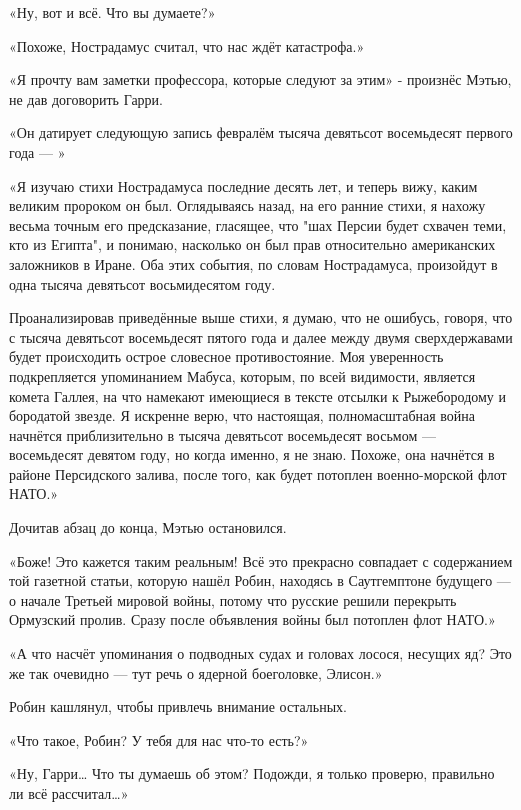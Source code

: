 \documentclass[a4paper,12pt]{book}
\begin{document}
\par
«Ну, вот и всё. Что вы думаете?»
\par
«Похоже, Нострадамус считал, что нас ждёт катастрофа.»
\par
«Я прочту вам заметки профессора, которые следуют за этим» - произнёс Мэтью, не дав договорить Гарри.
\par
«Он датирует следующую запись февралём тысяча девятьсот восемьдесят первого года — »\\
\par
«Я изучаю стихи Нострадамуса последние десять лет, и теперь вижу, каким великим пророком он был. Оглядываясь назад, на его ранние стихи, я нахожу весьма точным его предсказание, гласящее, что "шах Персии будет схвачен теми, кто из Египта", и понимаю, насколько он был прав относительно американских заложников в Иране. Оба этих события, по словам Нострадамуса, произойдут в одна тысяча девятьсот восьмидесятом году.
\par
Проанализировав приведённые выше стихи, я думаю, что не ошибусь, говоря, что с тысяча девятьсот восемьдесят пятого года и далее между двумя сверхдержавами будет происходить острое словесное противостояние. Моя уверенность подкрепляется упоминанием Мабуса, которым, по всей видимости, является комета Галлея, на что намекают имеющиеся в тексте отсылки к Рыжебородому и бородатой звезде. Я искренне верю, что настоящая, полномасштабная война начнётся приблизительно в тысяча девятьсот восемьдесят восьмом — восемьдесят девятом году, но когда именно, я не знаю. Похоже, она начнётся в районе Персидского залива, после того, как будет потоплен военно-морской флот НАТО.»\\
\par
Дочитав абзац до конца, Мэтью остановился.
\par
«Боже! Это кажется таким реальным! Всё это прекрасно совпадает с содержанием той газетной статьи, которую нашёл Робин, находясь в Саутгемптоне будущего — о начале Третьей мировой войны, потому что русские решили перекрыть Ормузский пролив. Сразу после объявления войны был потоплен флот НАТО.»
\par
«А что насчёт упоминания о подводных судах и головах лосося, несущих яд? Это же так очевидно — тут речь о ядерной боеголовке, Элисон.»
\par
Робин кашлянул, чтобы привлечь внимание остальных.
\par
«Что такое, Робин? У тебя для нас что-то есть?»
\par
«Ну, Гарри… Что ты думаешь об этом? Подожди, я только проверю, правильно ли всё рассчитал…»
\end{document}
